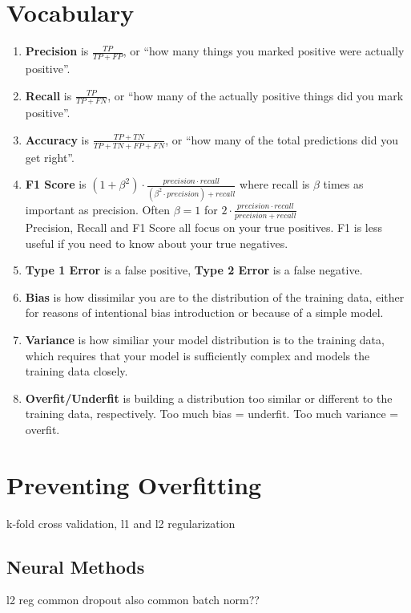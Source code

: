 \documentclass[11pt]{article}
\begin{document}
\section{Vocabulary}
\begin{enumerate}
\item \textbf{Precision} is $\frac{TP}{TP + FP}$, or ``how many things you marked positive were actually positive''. 
\item \textbf{Recall} is $\frac{TP}{TP + FN}$, or ``how many of the actually positive things did you mark positive''.
\item  \textbf{Accuracy} is $\frac{TP + TN}{TP + TN + FP + FN}$, or ``how many of the total predictions did you get right''.
\item \textbf{F1 Score} is $(1 + \beta^2) \cdot \frac{precision \cdot recall}{(\beta^2 \cdot precision) + recall}$ where recall is $\beta$ times as important as precision. Often $\beta = 1$ for $2 \cdot \frac{precision \cdot recall}{precision + recall}$\\

Precision, Recall and F1 Score all focus on your true positives. F1 is less useful if you need to know about your true negatives.
\item \textbf{Type 1 Error} is a false positive, \textbf{Type 2 Error} is a false negative.
\item \textbf{Bias} is how dissimilar you are to the distribution of the training data, either for reasons of intentional bias introduction or because of a simple model.
\item \textbf{Variance} is how similiar your model distribution is to the training data, which requires that your model is sufficiently complex and models the training data closely.
\item \textbf{Overfit/Underfit} is building a distribution too similar or different to the training data, respectively. Too much bias = underfit. Too much variance = overfit. 
\end{enumerate}

\section{Preventing Overfitting}
k-fold cross validation, l1 and l2 regularization
\subsection{Neural Methods}
l2 reg common
dropout also common
batch norm??
\end{document}
